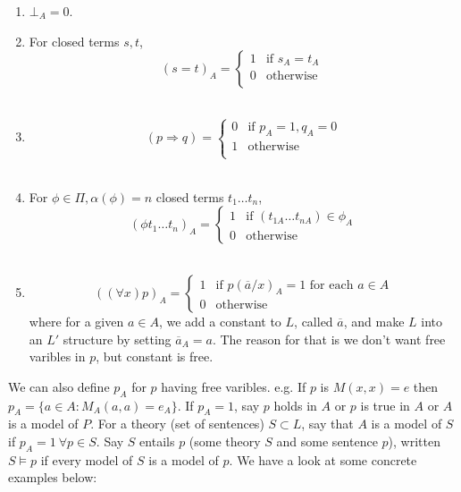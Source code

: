 \begin{enumerate}
\item $\bot_A =0$.\\
\item For closed terms $s,t$,
\begin{equation*}
(s=t)_A = \left\{
\begin{array}{ll}
1 & \text{if } s_A=t_A\\
0 & \text{otherwise } \\
\end{array} \right.
\end{equation*} \\
\item
\begin{equation*}
(p \Rightarrow q) = \left\{
\begin{array}{ll}
0 & \text{if } p_A=1, q_A=0\\
1 & \text{otherwise } \\
\end{array} \right.
\end{equation*} \\
\item For $\phi \in \Pi, \alpha(\phi)=n$ closed terms $t_1 \ldots t_n$,
\begin{equation*}
(\phi t_1 \ldots t_n)_A = \left\{
\begin{array}{ll}
1 & \text{if } (t_{1A} \ldots t_{nA}) \in \phi_A\\
0 & \text{otherwise }
\end{array} \right.
\end{equation*}\\
\item
\begin{equation*}
((\forall x)p)_A= \left\{
\begin{array}{ll}
1 & \text{if } p(\overline{a}/x)_A=1 \text{ for each } a\in A \\
0 & \text{otherwise }
\end{array} \right.
\end{equation*}
where for a given $a \in A$, we add a constant to $L$, called $\overline{a}$, and make $L$ into an $L'$ structure by setting $\overline{a}_A =a$. The reason for that is we don't want free varibles in $p$, but constant is free.
\end{enumerate}
We can also define $p_A$ for $p$ having free varibles.
e.g. If $p$ is $M(x,x)=e$ then $p_A = \{a \in A: M_A(a,a)=e_A\}$. If $p_A=1$, say $p$ holds in $A$ or $p$ is true in $A$ or $A$ is a model of $P$. For a theory (set of sentences) $S \subset L$, say that $A$ is a model of $S$ if $p_A=1~\forall p \in S$. Say $S$ entails $p$ (some theory $S$ and some sentence $p$), written $S \models p$ if every model of $S$ is a model of $p$. We have a look at some concrete examples below:
